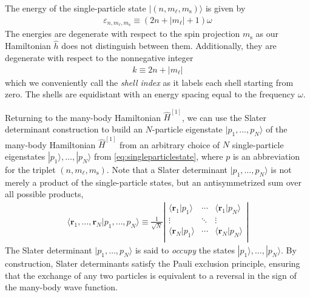 The energy of the single-particle state $| (n, m_\ell, m_{\mathrm{s}}) \rangle$ is given by
\begin{align} \label{eq:energysingleparticlestate}
  \varepsilon_{n, m_\ell, m_{\mathrm{s}}} \equiv (2 n + |m_\ell| + 1) \omega
\end{align}
The energies are degenerate with respect to the spin projection $m_{\mathrm{s}}$ as our Hamiltonian $\hat{h}$ does not distinguish between them.  Additionally, they are degenerate with respect to the nonnegative integer
\begin{align} \label{eq:shell_index}
  k \equiv 2 n + |m_\ell|
\end{align}
which we conveniently call the \textit{shell index} as it labels each shell starting from zero.  The shells are equidistant with an energy spacing equal to the frequency $\omega$.

Returning to the many-body Hamiltonian $\hat{H}^{[1]}$, we can use the Slater determinant construction to build an $N$-particle eigenstate $|p_1, \ldots, p_N\rangle$ of the many-body Hamiltonian $\hat{H}^{[1]}$ from an arbitrary choice of $N$ single-particle eigenstates $|p_1\rangle, \ldots, |p_N\rangle$ from \eqref{eq:singleparticlestate}, where $p$ is an abbreviation for the triplet $(n, m_\ell, m_{\mathrm{s}})$.  Note that a Slater determinant $|p_1, \ldots, p_N\rangle$ is not merely a product of the single-particle states, but an antisymmetrized sum over all possible products,
\begin{align*}
  \langle \bm{r}_1, \ldots, \bm{r}_N | p_1, \ldots, p_N \rangle \equiv
  \frac{1}{\sqrt{N}} \left|
  \begin{matrix}
    \langle \bm{r}_1 | p_1 \rangle & \cdots & \langle \bm{r}_1 | p_N \rangle \\
    \vdots & \ddots & \vdots \\
    \langle \bm{r}_N | p_1 \rangle & \cdots & \langle \bm{r}_N | p_N \rangle \\
  \end{matrix}
  \right|
\end{align*}
The Slater determinant $|p_1, \ldots, p_N\rangle$ is said to \textit{occupy} the states $|p_1\rangle, \ldots, |p_N\rangle$.  By construction, Slater determinants satisfy the Pauli exclusion principle, ensuring that the exchange of any two particles is equivalent to a reversal in the sign of the many-body wave function.

